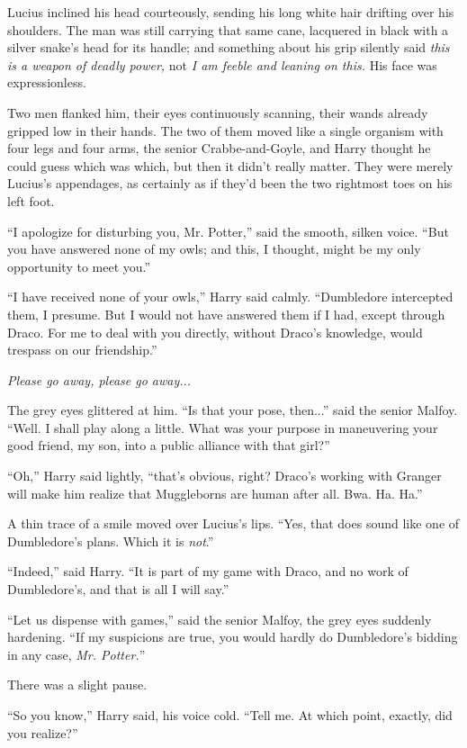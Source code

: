 Lucius inclined his head courteously, sending his long white hair drifting over his shoulders. The man was still carrying that same cane, lacquered in black with a silver snake's head for its handle; and something about his grip silently said \emph{this is a weapon of deadly power,} not \emph{I am feeble and leaning on this.} His face was expressionless.

Two men flanked him, their eyes continuously scanning, their wands already gripped low in their hands. The two of them moved like a single organism with four legs and four arms, the senior Crabbe-and-Goyle, and Harry thought he could guess which was which, but then it didn't really matter. They were merely Lucius's appendages, as certainly as if they'd been the two rightmost toes on his left foot.

``I apologize for disturbing you, Mr. Potter,'' said the smooth, silken voice. ``But you have answered none of my owls; and this, I thought, might be my only opportunity to meet you.''

``I have received none of your owls,'' Harry said calmly. ``Dumbledore intercepted them, I presume. But I would not have answered them if I had, except through Draco. For me to deal with you directly, without Draco's knowledge, would trespass on our friendship.''

\emph{Please go away, please go away...}

The grey eyes glittered at him. ``Is that your pose, then...'' said the senior Malfoy. ``Well. I shall play along a little. What was your purpose in maneuvering your good friend, my son, into a public alliance with that girl?''

``Oh,'' Harry said lightly, ``that's obvious, right? Draco's working with Granger will make him realize that Muggleborns are human after all. Bwa. Ha. Ha.''

A thin trace of a smile moved over Lucius's lips. ``Yes, that does sound like one of Dumbledore's plans. Which it is \emph{not}.''

``Indeed,'' said Harry. ``It is part of my game with Draco, and no work of Dumbledore's, and that is all I will say.''

``Let us dispense with games,'' said the senior Malfoy, the grey eyes suddenly hardening. ``If my suspicions are true, you would hardly do Dumbledore's bidding in any case, \emph{Mr. Potter.}''

There was a slight pause.

``So you know,'' Harry said, his voice cold. ``Tell me. At which point, exactly, did you realize?''

